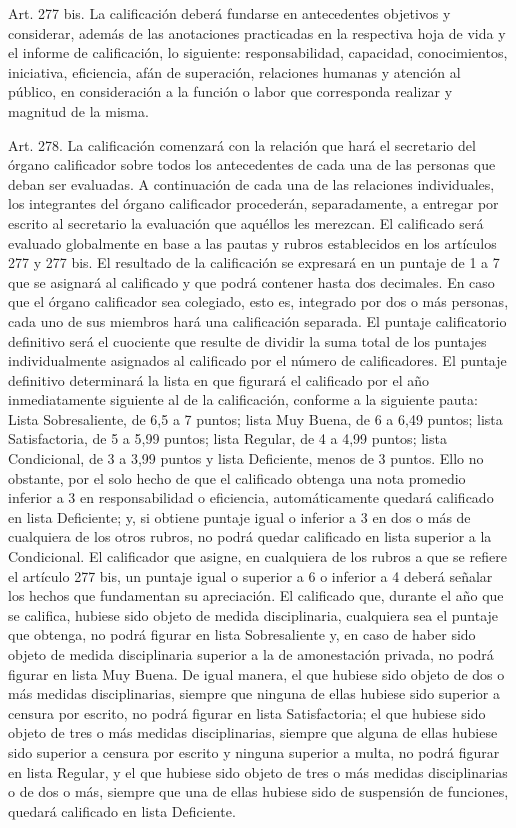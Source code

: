     Art. 277 bis. La calificación deberá fundarse en antecedentes objetivos y considerar, además de las anotaciones practicadas en la respectiva hoja de vida y el informe de calificación, lo siguiente: responsabilidad, capacidad, conocimientos, iniciativa, eficiencia, afán de superación, relaciones humanas y atención al público, en consideración a la función o labor que corresponda realizar y magnitud de la misma.

    Art. 278. La calificación comenzará con la relación que hará el secretario del órgano calificador sobre todos los antecedentes de cada una de las personas que deban ser evaluadas. A continuación de cada una de las relaciones individuales, los integrantes del órgano calificador procederán, separadamente, a entregar por escrito al secretario la evaluación que aquéllos les merezcan.
    El calificado será evaluado globalmente en base a las pautas y rubros establecidos en los artículos 277 y 277 bis. El resultado de la calificación se expresará en un puntaje de 1 a 7 que se asignará al calificado y que podrá contener hasta dos decimales. En caso que el órgano calificador sea colegiado, esto es, integrado por dos o más personas, cada uno de sus miembros hará una calificación separada. El puntaje calificatorio definitivo será el cuociente que resulte de dividir la suma total de los puntajes individualmente asignados al calificado por el número de calificadores.
    El puntaje definitivo determinará la lista en que figurará el calificado por el año inmediatamente siguiente al de la calificación, conforme a la siguiente pauta: Lista Sobresaliente, de 6,5 a 7 puntos; lista Muy Buena, de 6 a 6,49 puntos; lista Satisfactoria, de 5 a 5,99 puntos; lista Regular, de 4 a 4,99 puntos; lista Condicional, de 3 a 3,99 puntos y lista Deficiente, menos de 3 puntos. Ello no obstante, por el solo hecho de que el calificado obtenga una nota promedio inferior a 3 en responsabilidad o eficiencia, automáticamente quedará calificado en lista Deficiente; y, si obtiene puntaje igual o inferior a 3 en dos o más de cualquiera de los otros rubros, no podrá quedar calificado en lista superior a la Condicional.
    El calificador que asigne, en cualquiera de los rubros a que se refiere el artículo 277 bis, un puntaje igual o superior a 6 o inferior a 4 deberá señalar los hechos que fundamentan su apreciación.
    El calificado que, durante el año que se califica, hubiese sido objeto de medida disciplinaria, cualquiera sea el puntaje que obtenga, no podrá figurar en lista Sobresaliente y, en caso de haber sido objeto de medida disciplinaria superior a la de amonestación privada, no podrá figurar en lista Muy Buena. De igual manera, el que hubiese sido objeto de dos o más medidas disciplinarias, siempre que ninguna de ellas hubiese sido superior a censura por escrito, no podrá figurar en lista Satisfactoria; el que hubiese sido objeto de tres o más medidas disciplinarias, siempre que alguna de ellas hubiese sido superior a censura por escrito y ninguna superior a multa, no podrá figurar en lista Regular, y el que hubiese sido objeto de tres o más medidas disciplinarias o de dos o más, siempre que una de ellas hubiese sido de suspensión de funciones, quedará calificado en lista Deficiente.
